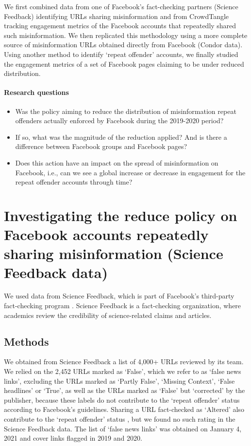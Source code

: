 \documentclass[review]{elsarticle}
\begin{document}
We first combined data from one of Facebook's fact-checking partners (Science Feedback) identifying URLs sharing misinformation and from CrowdTangle tracking engagement metrics of the Facebook accounts that repeatedly shared such misinformation.
We then replicated this methodology using a more complete source of misinformation URLs obtained directly from Facebook (Condor data).
Using another method to identify `repeat offender' accounts, we finally studied the engagement metrics of a set of Facebook pages claiming to be under reduced distribution.

\paragraph{Research questions}
\begin{itemize}
\item Was the policy aiming to reduce the distribution of misinformation repeat offenders actually enforced by Facebook during the 2019-2020 period?
\item If so, what was the magnitude of the reduction applied? And is there a difference between Facebook groups and Facebook pages?
\item Does this action have an impact on the spread of misinformation on Facebook, i.e., can we see a global increase or decrease in engagement for the repeat offender accounts through time?
\end{itemize}

\section{Investigating the reduce policy on Facebook accounts repeatedly sharing misinformation (Science Feedback data)}

We used data from Science Feedback, which is part of Facebook’s third-party fact-checking program \cite{sciencefeedbackFbPartner}. 
Science Feedback is a fact-checking organization, where academics review the credibility of science-related claims and articles.

\subsection{Methods}

We obtained from Science Feedback a list of 4,000+ URLs reviewed by its team. 
We relied on the 2,452 URLs marked as `False', which we refer to as `false news links', excluding the URLs marked as `Partly False', `Missing Context', `False headlines' or `True', as well as the URLs marked as `False' but `corrected' by the publisher, because these labels do not contribute to the `repeat offender' status according to Facebook's guidelines.
Sharing a URL fact-checked as `Altered' also contribute to the `repeat offender' status \citep{factCheckingRules, repeatOffenderCommunication}, but we found no such rating in the Science Feedback data.
The list of `false news links' was obtained on January 4, 2021 and cover links flagged in 2019 and 2020.
\end{document}
